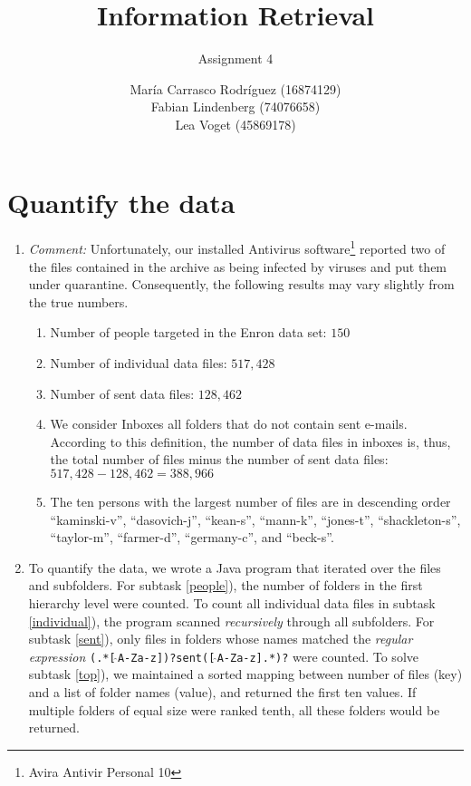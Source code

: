 \documentclass[a4paper,11pt,oneside]{book}
\title{Information Retrieval }
\subtitle{Assignment 4}
\author{ María Carrasco Rodríguez (16874129) \\
		Fabian Lindenberg (74076658) \\
		Lea Voget (45869178)}
\begin{document}
\kostspieligmaketitle


\setcounter{chapter}{1}
\chapter{Quantify the data}

\begin{enumerate}
	\item \emph{Comment:} Unfortunately, our installed Antivirus software\footnote{Avira Antivir Personal 10} reported two of the files contained in the archive as being infected by viruses and put them under quarantine. Consequently, the following results may vary slightly from the true numbers.
		\begin{enumerate}
			\renewcommand{\labelenumii}{\alph{enumii})}
			\item \label{people} Number of people targeted in the Enron data set: $150$
			\item \label{individual} Number of individual data files: $517,428$
			\item \label{sent}Number of sent data files: $128,462$
			\item We consider Inboxes all folders that do not contain sent e-mails. According to this definition, the number of data files in inboxes is, thus, the total number of files minus the number of sent data files: $517,428 - 128,462 = 388,966$
			\item \label{top} The ten persons with the largest number of files are in descending order ``kaminski-v'', ``dasovich-j'', ``kean-s'', ``mann-k'', ``jones-t'', ``shackleton-s'', ``taylor-m'', ``farmer-d'', ``germany-c'', and ``beck-s''.
		\end{enumerate}
	\item To quantify the data, we wrote a Java program that iterated over the files and subfolders. For subtask \ref{people}), the number of folders in the first hierarchy level were counted. To count all individual data files in subtask \ref{individual}), the program scanned \emph{recursively} through all subfolders. For subtask \ref{sent}), only files in folders whose names matched the \emph{regular expression} \texttt{(.*[$\,\hat{}$A-Za-z])?sent([$\,\hat{}$A-Za-z].*)?} were counted. To solve subtask \ref{top}), we maintained a sorted mapping between number of files (key) and a list of folder names (value), and returned the first ten values. If multiple folders of equal size were ranked tenth, all these folders would be returned.
\end{enumerate}
\end{document}
